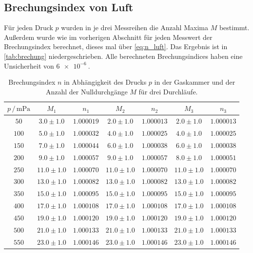 \subsection{Brechungsindex von Luft}
Für jeden Druck $p$ wurden in je drei Messreihen die Anzahl Maxima $M$ bestimmt.
Außerdem wurde wie im vorherigen Abschnitt für jeden Messwert der Brechungsindex berechnet, dieses mal über \autoref{eq:n_luft}.
Das Ergebnis ist in \autoref{tab:brechung} niedergeschrieben.
Alle berechneten Brechungsindices haben eine Unsicherheit von $\qty{6e-6}{}$.
\begin{table}
    \centering
    \caption{Brechungsindex $n$ in Abhängigkeit des Drucks $p$ in der Gaskammer und der Anzahl der Nulldurchgänge $M$ für drei Durchläufe.}
    \label{tab:brechung}
    \begin{tabular}{c c c c c c c}
        \toprule
        $p \,/\, \unit{\milli\pascal}$ & $M_1$ & $n_1$ & $M_2$ & $n_2$ & $M_3$ & $n_3$ \\
        \midrule
        $50	    $ & $ 3.0\pm1.0	$ & $   1.000019$ & $ 	2.0\pm1.0 $ & $	1.000013$ & $	2.0\pm1.0	$ & $1.000013$ \\
    	$100	$ & $ 5.0\pm1.0	$ & $   1.000032$ & $ 	4.0\pm1.0 $ & $	1.000025$ & $	4.0\pm1.0	$ & $1.000025$ \\
    	$150	$ & $ 7.0\pm1.0	$ & $   1.000044$ & $ 	6.0\pm1.0 $ & $	1.000038$ & $	6.0\pm1.0	$ & $1.000038$ \\
    	$200	$ & $ 9.0\pm1.0	$ & $   1.000057$ & $ 	9.0\pm1.0 $ & $	1.000057$ & $	8.0\pm1.0	$ & $1.000051$ \\
    	$250	$ & $ 11.0\pm1.0$ & $	1.000070$ & $ 	11.0\pm1.0$ & $	1.000070$ & $	11.0\pm1.0	$ & $1.000070$ \\
    	$300	$ & $ 13.0\pm1.0$ & $	1.000082$ & $ 	13.0\pm1.0$ & $	1.000082$ & $	13.0\pm1.0	$ & $1.000082$ \\
    	$350	$ & $ 15.0\pm1.0$ & $	1.000095$ & $ 	15.0\pm1.0$ & $	1.000095$ & $	15.0\pm1.0	$ & $1.000095$ \\
    	$400	$ & $ 17.0\pm1.0$ & $	1.000108$ & $ 	17.0\pm1.0$ & $	1.000108$ & $	17.0\pm1.0	$ & $1.000108$ \\
    	$450	$ & $ 19.0\pm1.0$ & $	1.000120$ & $ 	19.0\pm1.0$ & $	1.000120$ & $	19.0\pm1.0	$ & $1.000120$ \\
    	$500	$ & $ 21.0\pm1.0$ & $	1.000133$ & $ 	21.0\pm1.0$ & $	1.000133$ & $	21.0\pm1.0	$ & $1.000133$ \\
    	$550	$ & $ 23.0\pm1.0$ & $	1.000146$ & $ 	23.0\pm1.0$ & $	1.000146$ & $	23.0\pm1.0	$ & $1.000146$ \\

\end{tabular}
\end{table}
